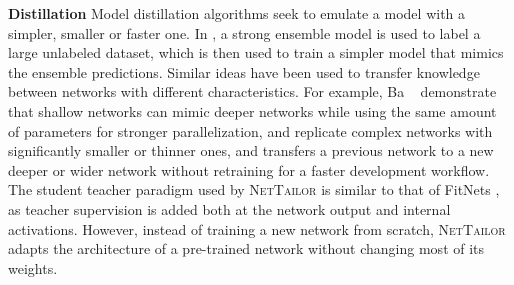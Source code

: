 \documentclass[10pt,twocolumn,letterpaper]{article}
\begin{document}
\noindent
{\bf Distillation}
Model distillation algorithms seek to emulate a model with a simpler, smaller or faster one. 
In \cite{buciluǎ2006model}, a strong ensemble model is used to label a large unlabeled dataset, which is then used to train a simpler model that mimics the ensemble predictions. 
Similar ideas have been used to transfer knowledge between networks with different characteristics. For example, Ba \etal~\cite{ba2014deep} demonstrate that shallow networks can mimic deeper networks while using the same amount of parameters for stronger parallelization, \cite{hinton2015distilling} and \cite{romero2014fitnets} replicate complex networks with significantly smaller or thinner ones, and \cite{chen2015net2net} transfers a previous network to a new deeper or wider network without retraining for a faster development workflow.
The student teacher paradigm used by \textsc{NetTailor} is similar to that of FitNets \cite{romero2014fitnets}, as teacher supervision is added both at the network output and internal activations. However, instead of training a new network from scratch, \textsc{NetTailor} adapts the architecture of a pre-trained network without changing most of its weights. 
\end{document}
